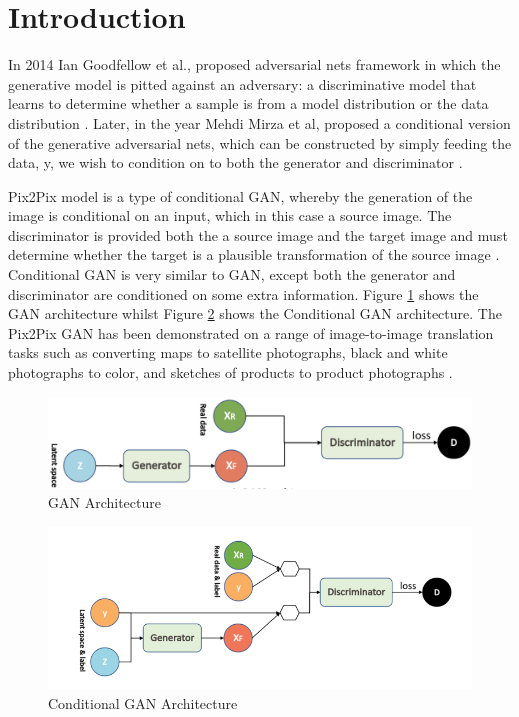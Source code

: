 \documentclass[conference]{IEEEtran}
\begin{document}
\section{Introduction}
In 2014 Ian Goodfellow et al., proposed adversarial nets framework in which the generative model is pitted against an adversary: a discriminative model that learns to determine whether a sample is from a model distribution or the data distribution \cite{goodfellow2014generative}. Later, in the year Mehdi Mirza et al, proposed a conditional version of the generative adversarial nets, which can be constructed by simply feeding the data, y, we wish to condition on to both the generator and discriminator \cite{mirza2014conditional}.

Pix2Pix model is a type of conditional GAN, whereby the generation of the image is conditional on an input, which in this case a source image. The discriminator is provided both the a source image and the target image and must determine whether the target is a plausible transformation of the source image \cite{pix2pix_ml}. Conditional GAN is very similar to GAN, except both the generator and discriminator are conditioned on some extra information. Figure \ref{fig:gan} shows the GAN architecture whilst Figure \ref{fig:condtionalgan} shows the Conditional GAN architecture. The Pix2Pix GAN has been demonstrated on a range of image-to-image translation tasks such as converting maps to satellite photographs, black and white photographs to color, and sketches of products to product photographs \cite{conditional_gan_explain}.

\begin{figure}[htbp]
    \centering
    \includegraphics[width=\columnwidth]{gan.png}
    \caption{GAN Architecture \protect\cite{conditional_gan_explain}}
    \label{fig:gan}
\end{figure}

\begin{figure}[htbp]
    \centering
    \includegraphics[width=\columnwidth]{cgan.png}
    \caption{Conditional GAN Architecture \protect\cite{conditional_gan_explain}}
    \label{fig:condtionalgan}
\end{figure}
\end{document}
